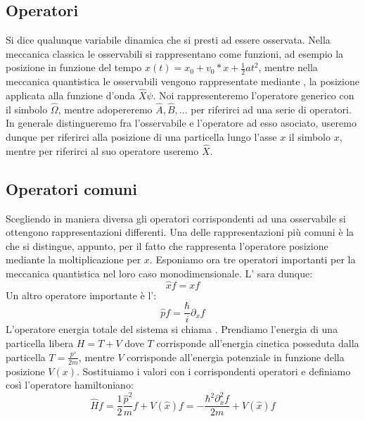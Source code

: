 \subsection{Operatori}
Si dice \textbf{} qualunque variabile dinamica che si presti ad essere osservata. Nella meccanica classica le osservabili si rappresentano come funzioni, ad esempio la posizione in funzione del tempo $x(t) = x_0 + v_0 * x + \frac{1}{2} a t^2$, mentre nella meccanica quantistica le osservabili vengono rappresentate mediante \textbf{}, la posizione applicata alla funzione d'onda $\hat{X}\psi$. Noi rappresenteremo l'operatore generico con il simbolo $\hat{\Omega}$, mentre adopereremo $\hat{A}, \hat{B}, ...$ per riferirci ad una serie di operatori. In generale distingueremo fra l'osservabile e l'operatore ad esso asociato, useremo dunque per riferirci alla posizione di una particella lungo l'asse $x$ il simbolo $x$, mentre per riferirci al suo operatore useremo $\hat{X}$.

\subsection{Operatori comuni}
Scegliendo in maniera diversa gli operatori corrispondenti ad una osservabile si ottengono rappresentazioni differenti. Una delle rappresentazioni più comuni è la \textbf{} che si distingue, appunto, per il fatto che rappresenta l'operatore posizione mediante la moltiplicazione per $x$. Esponiamo ora tre operatori importanti per la meccanica quantistica nel loro caso monodimensionale. L'\textbf{} sara dunque:
$$\hat{x} f = x f$$
Un altro operatore importante è l'\textbf{}:
$$\hat{p} f = \frac{\hbar}{i} \partial_x f$$
L'operatore energia totale del sistema si chiama \textbf{}. Prendiamo l'energia di una particella libera $H = T + V$ dove $T$ corrisponde all'energia cinetica posseduta dalla particella $T = \frac{p^s}{2 m}$, mentre $V$ corrisponde all'energia potenziale in funzione della posizione $V(x)$. Sostituiamo i valori con i corrispondenti operatori e definiamo così l'operatore hamiltoniano:
$$\hat{H} f = \frac{1}{2}\frac{\hat{p}^2}{m} f + V(\hat{x}) f = -\frac{\hbar^2 \partial_x^2 f}{2 m} + V(\hat{x}) f$$


